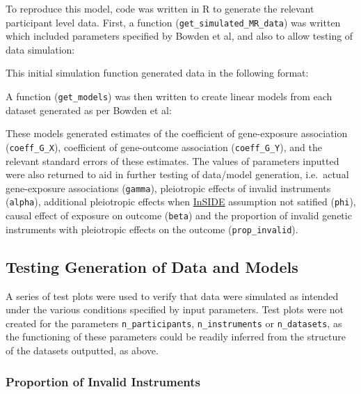 \documentclass[
]{article}
\begin{document}
To reproduce this model, code was written in R to generate the relevant participant level data. First, a function (\texttt{get\_simulated\_MR\_data}) was written which included parameters specified by Bowden et al, and also to allow testing of data simulation:

This initial simulation function generated data in the following format:

A function (\texttt{get\_models}) was then written to create linear models from each dataset generated as per Bowden et al:

These models generated estimates of the coefficient of gene-exposure association (\texttt{coeff\_G\_X}), coefficient of gene-outcome association (\texttt{coeff\_G\_Y}), and the relevant standard errors of these estimates. The values of parameters inputted were also returned to aid in further testing of data/model generation, i.e.~actual gene-exposure associations (\texttt{gamma}), pleiotropic effects of invalid instruments (\texttt{alpha}), additional pleiotropic effects when \hyperref[acronyms_InSIDE]{InSIDE} assumption not satified (\texttt{phi}), causal effect of exposure on outcome (\texttt{beta}) and the proportion of invalid genetic instruments with pleiotropic effects on the outcome (\texttt{prop\_invalid}).

\newpage

\subsection{Testing Generation of Data and Models}\label{appendix-sim-test}

A series of test plots were used to verify that data were simulated as intended under the various conditions specified by input parameters. Test plots were not created for the parameters \texttt{n\_participants}, \texttt{n\_instruments} or \texttt{n\_datasets}, as the functioning of these parameters could be readily inferred from the structure of the datasets outputted, as above.

\subsubsection{Proportion of Invalid Instruments}\label{proportion-of-invalid-instruments}
\end{document}

